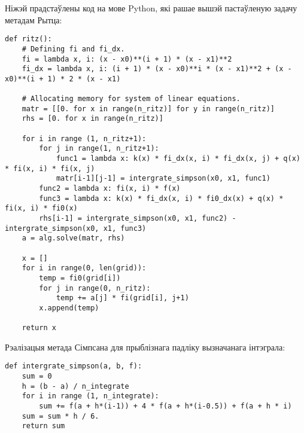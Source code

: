Ніжэй прадстаўлены код на мове Python, які рашае вышэй пастаўленую задачу метадам Рытца:
\begin{verbatim}
def ritz():
    # Defining fi and fi_dx.
    fi = lambda x, i: (x - x0)**(i + 1) * (x - x1)**2
    fi_dx = lambda x, i: (i + 1) * (x - x0)**i * (x - x1)**2 + (x - x0)**(i + 1) * 2 * (x - x1)

    # Allocating memory for system of linear equations.
    matr = [[0. for x in range(n_ritz)] for y in range(n_ritz)]
    rhs = [0. for x in range(n_ritz)]

    for i in range (1, n_ritz+1):
        for j in range(1, n_ritz+1):
            func1 = lambda x: k(x) * fi_dx(x, i) * fi_dx(x, j) + q(x) * fi(x, i) * fi(x, j)
            matr[i-1][j-1] = intergrate_simpson(x0, x1, func1)
        func2 = lambda x: fi(x, i) * f(x)
        func3 = lambda x: k(x) * fi_dx(x, i) * fi0_dx(x) + q(x) * fi(x, i) * fi0(x)
        rhs[i-1] = intergrate_simpson(x0, x1, func2) - intergrate_simpson(x0, x1, func3)
    a = alg.solve(matr, rhs)

    x = []
    for i in range(0, len(grid)):
        temp = fi0(grid[i])
        for j in range(0, n_ritz):
            temp += a[j] * fi(grid[i], j+1)
        x.append(temp)

    return x
\end{verbatim}

Рэалізацыя метада Сімпсана для прыблізнага падліку вызначанага інтэграла:
\begin{verbatim}
def intergrate_simpson(a, b, f):
    sum = 0
    h = (b - a) / n_integrate
    for i in range (1, n_integrate):
        sum += f(a + h*(i-1)) + 4 * f(a + h*(i-0.5)) + f(a + h * i)
    sum = sum * h / 6.
    return sum
\end{verbatim}
